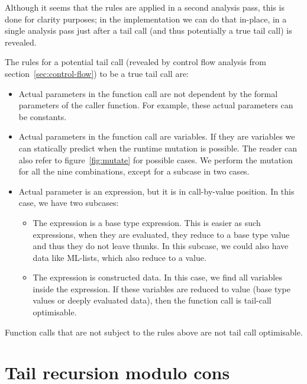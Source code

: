 \documentclass[diploma]{softlab-thesis}
\begin{document}
Although it seems that the rules are applied in a second analysis pass, this is done for clarity 
purposes; in the implementation we can do that in-place, in a single analysis pass just after a 
tail call (and thus potentially a true tail call) is revealed.

The rules for a potential tail call (revealed by control flow analysis from 
section~\ref{sec:control-flow}) to be a true tail call are:
\begin{itemize}
  \item Actual parameters in the function call are not dependent by the formal parameters of 
  the caller function. For example, these actual parameters can be constants. 
  \item Actual parameters in the function call are variables. If they are variables we can 
  statically predict when the runtime mutation is possible. The reader can also refer to 
  figure~\ref{fig:mutate} for possible cases. We perform the mutation for all the nine 
  combinations, except for a subcase in two cases. 
  \item Actual parameter is an expression, but it is in call-by-value position. In this case, we 
  have two subcases:
    \begin{itemize}
      \item The expression is a base type expression. This is easier as such expressions,
      when they are evaluated, they reduce to a base type value and thus they do not leave thunks. 
      In this subcase, we could also have data like ML-lists, which also reduce to a value.
      \item The expression is constructed data. In this case, we find all variables inside the 
      expression. If these variables are reduced to value (base type values or deeply evaluated 
      data), then the function call is tail-call optimisable.
    \end{itemize}
\end{itemize}

Function calls that are not subject to the rules above are not tail call optimisable.


\section{Tail recursion modulo cons}
\label{sec:modulo-cons-analysis}

\end{document}
